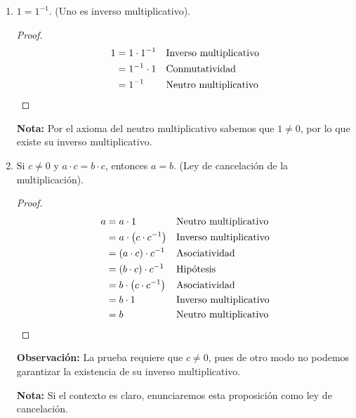 \documentclass[11pt]{article}
\begin{document}
\begin{enumerate}[label=\alph*)]
 \item $1=1^{-1}$. (Uno es inverso multiplicativo).
 \begin{proof} 
 \begin{align*}
  1 &= 1 \cdot 1^{-1} && \text{Inverso multiplicativo}\\
  &= 1^{-1} \cdot 1 && \text{Conmutatividad}\\
  &= 1^{-1} && \text{Neutro multiplicativo} \qedhere
 \end{align*} 
 \end{proof}
 \textbf{Nota:} Por el axioma del neutro multiplicativo sabemos que $1\neq 0$, por lo que existe su inverso multiplicativo.


 
 \item Si $c\neq 0$ y $a\cdot c=b\cdot c$, entonces $a=b$. (Ley de cancelación de la multiplicación).
 \begin{proof} 
  \begin{align*}
   a &= a\cdot 1 && \text{Neutro multiplicativo}\\
   &= a \cdot \bigl(c\cdot c^{-1}\bigr) && \text{Inverso multiplicativo}\\
   &= (a \cdot c) \cdot c^{-1} && \text{Asociatividad}\\
   &= (b \cdot c) \cdot c^{-1} && \text{Hipótesis}\\
   &= b \cdot \bigl(c\cdot c^{-1}\bigr) && \text{Asociatividad}\\
   &= b \cdot 1 && \text{Inverso multiplicativo}\\
   &= b && \text{Neutro multiplicativo}\qedhere
   \end{align*} 
 \end{proof}
 \textbf{Observación:} La prueba requiere que $c\neq 0$, pues de otro modo no podemos garantizar la existencia de su inverso multiplicativo.

 \textbf{Nota:} Si el contexto es claro, enunciaremos esta proposición como ley de cancelación.
 \end{enumerate}
 
\end{document}
